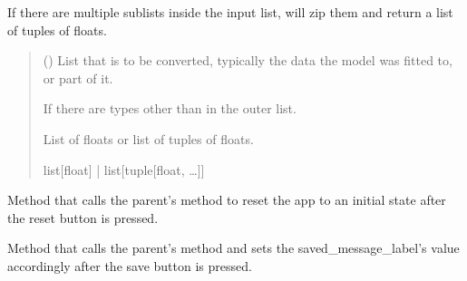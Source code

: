 \documentclass[letterpaper,10pt,english]{sphinxmanual}
\begin{document}
\begin{fulllineitems}
\begin{fulllineitems}
\sphinxAtStartPar
If there are multiple sub\sphinxhyphen{}lists inside the input list, will zip them
and return a list of tuples of floats.
\begin{quote}\begin{description}
\sphinxAtStartPar
{} (\sphinxstyleliteralemphasis{\sphinxupquote{{[}}}\sphinxstyleliteralemphasis{\sphinxupquote{{[}}}\sphinxstyleliteralemphasis{\sphinxupquote{{]}}}\sphinxstyleliteralemphasis{\sphinxupquote{{]}}}) \textendash{} List that is to be converted, typically the data the model was fitted to, or part of it.

\sphinxAtStartPar
{} \textendash{} If there are types other than  in the outer list.

\sphinxAtStartPar
List of floats or list of tuples of floats.

\sphinxAtStartPar
list{[}float{]} | list{[}tuple{[}float, …{]}{]}

\end{description}\end{quote}

\end{fulllineitems}


\begin{fulllineitems}
\label{\detokenize{CTkResultInterface:src.CTkResultInterface.ResultInterface.reset_app}}
\pysigstartsignatures
{}
\pysigstopsignatures
\sphinxAtStartPar
Method that calls the parent’s  method to reset the app to an
initial state after the reset button is pressed.

\end{fulllineitems}


\begin{fulllineitems}
\label{\detokenize{CTkResultInterface:src.CTkResultInterface.ResultInterface.save_as}}
\pysigstartsignatures
{}
\pysigstopsignatures
\sphinxAtStartPar
Method that calls the parent’s  method and
sets the saved\_message\_label’s value accordingly after the save button is pressed.


\end{fulllineitems}
\end{fulllineitems}
\end{document}
